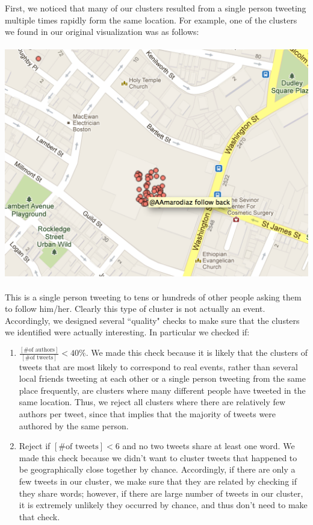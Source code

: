 \documentclass[pdftex,12pt,a4paper]{article}
\begin{document}
First, we noticed that many of our clusters resulted from a single person tweeting multiple times rapidly form the same location. For example, one of the clusters we found in our original visualization was as follows: \\ \\
\includegraphics[width=5.5in]{lonely.png} \\ \\
This is a single person tweeting to tens or hundreds of other people asking them to follow him/her. Clearly this type of cluster is not actually an event. Accordingly, we designed several ``quality" checks to make sure that the clusters we identified were actually interesting. In particular we checked if:
\begin{enumerate}
\item $\frac{[\text{\# of authors}]}{[\text{\# of tweets}]} < 40\%$. We made this check because it is likely that the clusters of tweets that are most likely to correspond to real events, rather than several local friends tweeting at each other or a single person tweeting from the same place frequently, are clusters where many different people have tweeted in the same location. Thus, we reject all clusters where there are relatively few authors per tweet, since that implies that the majority of tweets were authored by the same person. 
\item Reject if $[\text{\# of tweets}] < 6$ and no two tweets share at least one word. We made this check because we didn't want to cluster tweets that happened to be geographically close together by chance. Accordingly, if there are only a few tweets in our cluster, we make sure that they are related by checking if they share words; however, if there are large number of tweets in our cluster, it is extremely unlikely they occurred by chance, and thus don't need to make that check.
\end{enumerate}
\end{document}

